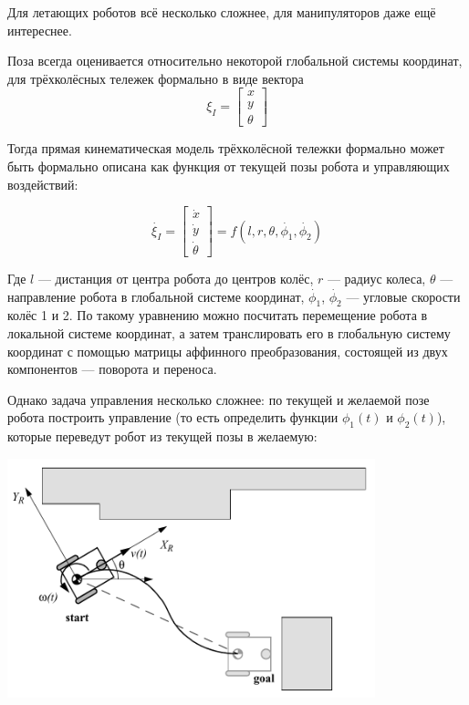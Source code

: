\documentclass{../../text-style}
\begin{document}
Для летающих роботов всё несколько сложнее, для манипуляторов даже ещё интереснее.

Поза всегда оценивается относительно некоторой глобальной системы координат, для трёхколёсных тележек формально в виде вектора
$$\xi_I = \begin{bmatrix} x \\ y \\ \theta \end{bmatrix}$$

Тогда прямая кинематическая модель трёхколёсной тележки формально может быть формально описана как функция от текущей позы робота и управляющих воздействий:

$$\dot{\xi_I} = \begin{bmatrix} \dot{x} \\ \dot{y} \\ \dot{\theta} \end{bmatrix} = f(l, r, \theta, \dot{\phi_1}, \dot{\phi_2})$$

Где $l$ --- дистанция от центра робота до центров колёс, $r$ --- радиус колеса, $\theta$ --- направление робота в глобальной системе координат, $\dot{\phi_1}$, $\dot{\phi_2}$ --- угловые скорости колёс 1 и 2. По такому уравнению можно посчитать перемещение робота в локальной системе координат, а затем транслировать его в глобальную систему координат с помощью матрицы аффинного преобразования, состоящей из двух компонентов --- поворота и переноса.

Однако задача управления несколько сложнее: по текущей и желаемой позе робота построить управление (то есть определить функции $\phi_1(t)$ и $\phi_2(t)$), которые переведут робот из текущей позы в желаемую:

\begin{center}
    \includegraphics[width=0.8\textwidth]{inverseKinematics.png}
\end{center}
\end{document}
